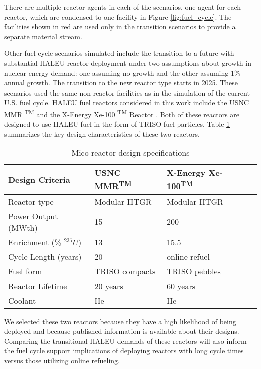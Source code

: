 There are multiple reactor agents in each of the scenarios, one agent for 
each reactor, which are condensed to one facility in Figure 
\ref{fig:fuel_cycle}. The facilities shown in red are used only in the 
transition scenarios to provide a separate material stream. 

Other fuel cycle scenarios simulated include the transition to a future with 
substantial \gls{HALEU} 
reactor deployment under two assumptions about growth in nuclear energy 
demand: one assuming no growth and the other assuming 1\% annual growth. 
The transition to the new reactor type starts in 2025. 
These scenarios used the same  
non-reactor facilities as in the simulation of the current 
U.S. fuel cycle. \gls{HALEU} fuel reactors 
considered in this work include the \gls{USNC} \gls{MMR} \textsuperscript{TM}
\cite{mitchell_usnc_2020} and the X-Energy Xe-100 \textsuperscript{TM} 
Reactor \cite{harlan_x-energy_2018}\cite{hussain_advances_2018}. Both of 
these reactors are designed 
to use \gls{HALEU} fuel in the form of \gls{TRISO} fuel particles. Table 
\ref{tab:reactor_summary} summarizes the key design characteristics of these 
two reactors.

\begin{table}[ht]
    \caption{Mico-reactor design specifications}
    \label{tab:reactor_summary}
    \begin{tabular}{l p{2.5cm}p{2.25cm}p{2.4cm}}
        \hline
        Design Criteria & \gls{USNC} \gls{MMR}\textsuperscript{TM} & 
            X-Energy Xe-100\textsuperscript{TM} \\\hline
        Reactor type & Modular HTGR & Modular HTGR \\
        Power Output (MWth) & 15 & 200 \\
        Enrichment (\% $^{235}U$) & 13 & 15.5 \\
        Cycle Length (years) & 20 & online refuel\\
        Fuel form & \gls{TRISO} compacts & \gls{TRISO} pebbles\\
        Reactor Lifetime & 20 years & 60 years \\
        Coolant & He & He \\
        \hline
    \end{tabular}
\end{table}
    
We selected these two reactors because they have a high 
likelihood of being deployed and because published information is 
available about their designs. Comparing the transitional \gls{HALEU} 
demands of these reactors will also inform the fuel cycle support 
implications of deploying reactors with long cycle 
times versus those utilizing online refueling. 

